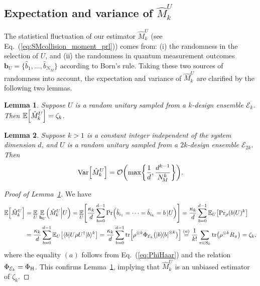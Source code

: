 \documentclass[aps,prl,twocolumn,nofootinbib,superscriptaddress,10pt]{revtex4-2}
\let\originalleft\left
\let\originalright\right
\renewcommand{\left}{\mathopen{}\mathclose\bgroup\originalleft}
\renewcommand{\right}{\aftergroup\egroup\originalright}
\def\E{ {\mathbb E} } %
\def\>{\rangle}
\def\<{\langle}
\newcommand{\ketbra}[2]{\ensuremath{\left|#1\right\rangle\!\left\langle#2\right|}}
\DeclareMathOperator{\Var}{Var}
\DeclareMathOperator{\Tr}{tr}
\newcommand{\bigo}[1]{\mathcal{O}\left(#1\right)}
\theoremstyle{plain}
\newtheorem{lemma}{Lemma}
\theoremstyle{definition}
\newcommand{\eref}[1]{Eq.~\textup{(\ref{#1})}}
\newcommand{\lref}[1]{Lemma~\ref{#1}}
\begin{document}
\subsection{Expectation and variance of \texorpdfstring{$\hat{M}_k^{U}$}{}}\label{sec:ExpVarCBNEmoment}
The statistical fluctuation of our estimator $\hat{M}_k^{U}$ (see \eref{eq:SMcollision_moment_prl}) comes from: 
(i) the randomness in the selection of $U$, and 
(ii) the randomness in quantum measurement outcomes $\mathbf{b}_{U} = \{\hat{b}_1, \dots, \hat{b}_{N_M}\}$ according to Born's rule. 
Taking these two sources of randomness into account, the expectation and variance of $\hat{M}_k^{U}$ are 
clarified by the following two lemmas.  


\begin{lemma}\label{lam:UnbiasMkU}
Suppose $U$ is a random unitary sampled from a $k$-design ensemble $\mathcal E_{k}$. 
Then $\E \left[ \hat{M}_k^{U}\right]= \zeta_k$. 
\end{lemma}



\begin{lemma}\label{lem:MomVariance}
Suppose $k>1$ is a constant integer independent of the system dimension $d$, and $U$ is a random unitary  sampled from a $2k$-design ensemble $\mathcal E_{2k}$. 
Then 
\begin{align}
	\Var\left[\hat{M}_k^{U}\right] 
	= \bigo{\max\left\lbrace \frac{1}{d} ,\frac{d^{k-1}}{N_{\!M}^{k}}\right\rbrace  } .
\end{align}
\end{lemma}


\begin{proof}[Proof of \lref{lam:UnbiasMkU}]
We have
\begin{align}
\E \left[ \hat{M}_k^{U}\right] 
&=\underset{U }{\E} \, \underset{\,\mathbf{b}_{U}}{\E} \left( \hat{M}_k^{U} \Big| U \right)
=\underset{U }{\E} \left[ \frac{\kappa_k}{d} \sum_{b=0}^{d-1} \Pr\left(\hat{b}_{i_1}=\dots=\hat{b}_{i_k}=b \,|U \right) \right] 
=\frac{\kappa_k}{d} \sum_{b=0}^{d-1} \E_{U} \left[ {\Pr}_{\rho}(b|U)^k \right] 
\nonumber \\
&=\frac{\kappa_k}{d} \sum_{b=0}^{d-1} \E_{U} \left[ \<b|U\rho U^{\dag}|b\>^k \right] 
= \frac{\kappa_k}{d} \sum_{b=0}^{d-1} \Tr \left[ \rho^{\otimes k}  \Phi_{\mathcal E_{k}} \big( \ketbra{b}{b}^{\otimes k} \big) \right]
\stackrel{(a)}{=}  \frac{1}{k!} \sum_{\pi\in \mathrm{S}_k}\Tr\left(\rho^{\otimes k}R_\pi\right)
= \zeta_k , 
\end{align}
where the equality $(a)$ follows from \eref{eq:PhiHaar} and the relation $\Phi_{\mathcal E_{k}}=\Phi_{\rm H}$. 
This confirms \lref{lam:UnbiasMkU}, implying that $\hat{M}_k^{U}$ is an unbiased estimator of $\zeta_k$. 
\end{proof}
\end{document}
